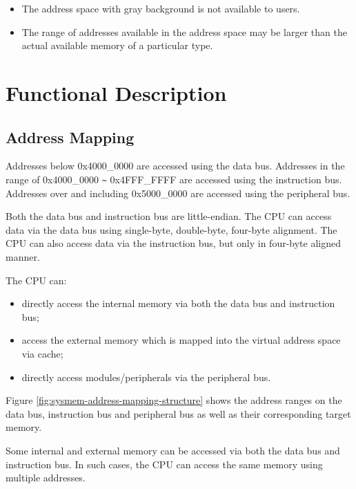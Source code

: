 \documentclass[main\_\_EN.tex]{subfiles}
\begin{document}
\begin{tiplisting}
\vspace{-2em}
\begin{itemize}
    \item The address space with gray background is not available to users.
    \item The range of addresses available in the address space may be larger than the actual available memory of a particular type.
\end{itemize}

\end{tiplisting}

\section{Functional Description}

\subsection{Address Mapping}

Addresses below 0x4000\_0000 are accessed using the data bus. Addresses in the range of 0x4000\_0000 \verb+~+ 0x4FFF\_FFFF are accessed using the instruction bus. Addresses over and including 0x5000\_0000 are accessed using the peripheral bus.

Both the data bus and instruction bus are little-endian. The CPU can access data via the data bus using single-byte, double-byte, four-byte alignment. The CPU can also access data via the instruction bus, but only in four-byte aligned manner.


The CPU can:
\begin{itemize}
\item directly access the internal memory via both the data bus and instruction bus;
\item  access the external memory which is mapped into the virtual address space via cache;
\item directly access modules/peripherals via the peripheral bus.
\end{itemize}

Figure \ref{fig:sysmem-address-mapping-structure} shows the address ranges on the data bus, instruction bus and peripheral bus as well as their corresponding target memory.

Some internal and external memory can be accessed via both the data bus and instruction bus. In such cases, the CPU can access the same memory using multiple addresses.
\end{document}
